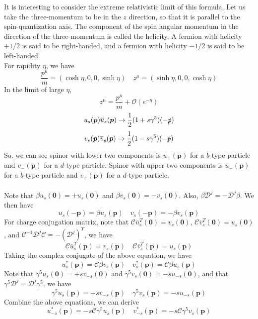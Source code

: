 \noindent
It is interesting to consider the extreme relativistic limit of this formula. Let us take the three-momentum to be in the $z$ direction, so that it is parallel to the spin-quantization axis. The component of the spin angular momentum in the direction of the three-momentum is called the helicity. A fermion with helicity $+1/2$ is said to be right-handed, and a fermion with helicity $-1/2$ is said to be left-handed. \\  
For rapidity $\eta$, we have
\[\frac{p^{\mu}}{m} = (\cosh \eta, 0, 0, \sinh \eta) \quad z^{\mu} = (\sinh \eta, 0, 0, \cosh \eta)\]
In the limit of large $\eta$,
\[z^{\mu} = \frac{p^{\mu}}{m} + \mathcal{O}(e^{-\eta})\]
\[u_s(\bm{p}) \overline{u}_s(\bm{p})  \to \frac{1}{2}(1+s\gamma^5)(-\slashed{p})\]
\[v_s(\bm{p}) \overline{v}_s(\bm{p})  \to \frac{1}{2}(1-s\gamma^5)(-\slashed{p})\]
So, we can see spinor with lower two components is $u_+(\bm{p})$ for a $b$-type particle and $v_-({\bm{p}})$ for a $d$-type particle.  
Spinor with upper two components is $u_-(\bm{p})$ for a $b$-type particle and $v_+(\bm{p})$ for a $d$-type particle.
\\ \\
Note that $\beta u_s(\bm{0}) = + u_s(\bm{0})$ and $\beta v_s(\bm{0}) = -v_s(\bm{0})$. Also, $\beta \mathcal{D}^j = - \mathcal{D}^j \beta$. We then have
\[u_s(-\bm{p}) = \beta u_s(\bm{p}) \quad v_s(-\bm{p}) = -\beta v_s(\bm{p})\]
For charge conjugation matrix, note that $\mathcal{C} \overline{u}^T_s(\bm{0}) = v_s(\bm{0})$, $\mathcal{C} \overline{v}^T_s(\bm{0}) = u_s(\bm{0})$, and $\mathcal{C}^{-1} \mathcal{D}^j \mathcal{C} = - (\mathcal{D}^j)^T$, we have
\[\mathcal{C} \overline{u}^T_s(\bm{p}) = v_s(\bm{p}) \quad \mathcal{C} \overline{v}^T_s(\bm{p}) = u_s(\bm{p})\]
Taking the complex conjugate of the above equation, we have
\[u^*_s(\bm{p}) = \mathcal{C}\beta v_s(\bm{p}) \quad v^*_s(\bm{p}) = \mathcal{C}\beta u_s(\bm{p})\]
Note that $\gamma^5 u_{s}(\bm{0}) = +s v_{-s}(\bm{0})$ and $\gamma^5 v_{s}(\bm{0}) = -s u_{-s}(\bm{0})$, and that $\gamma^5 \mathcal{D}^j = \mathcal{D}^j \gamma^5$, we have
\[\gamma^5 u_{s}(\bm{p}) = +s v_{-s}(\bm{p}) \quad \gamma^5 v_{s}(\bm{p}) = -s u_{-s}(\bm{p})\]
Combine the above equations, we can derive
\[u^*_{-s}(\bm{p}) = -s\mathcal{C}\gamma^5 u_s(\bm{p}) \quad v^*_{-s}(\bm{p}) = -s\mathcal{C}\gamma^5 v_s(\bm{p})\]

